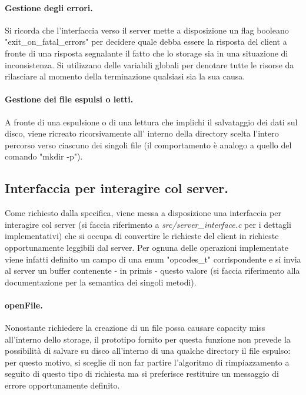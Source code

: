 \documentclass[11pt, italian, openany]{book}
\begin{document}
\begin{sloppypar}
\paragraph*{Gestione degli errori.}
Si ricorda che l'interfaccia verso il server mette a disposizione un flag booleano "exit\_on\_fatal\_errors" per decidere quale
debba essere la risposta del client a fronte di una risposta segnalante il fatto che lo storage sia in una situazione di
inconsistenza. Si utilizzano delle variabili globali per denotare tutte le risorse da rilasciare al momento della terminazione
qualsiasi sia la sua causa.

\paragraph*{Gestione dei file espulsi o letti.}
A fronte di una espulsione o di una lettura che implichi il salvataggio dei dati sul disco, viene ricreato ricorsivamente all'
interno della directory scelta l'intero percorso verso ciascuno dei singoli file (il comportamento \`e analogo a quello del comando
"mkdir -p").

\subsection{Interfaccia per interagire col server.}
Come richiesto dalla specifica, viene messa a disposizione una interfaccia per interagire col server (si faccia riferimento a 
\textit{src/server\_interface.c} per i dettagli implementativi) che si occupa di convertire le richieste del client in
richieste opportunamente leggibili dal server. Per ognuna delle operazioni implementate viene infatti definito un campo di una enum
"opcodes\_t" corrispondente e si invia al server un buffer contenente - in primis - questo valore (si faccia riferimento alla
documentazione per la semantica dei singoli metodi).

\paragraph*{openFile.}
Nonostante richiedere la creazione di un file possa causare capacity miss all'interno dello storage, il prototipo fornito
per questa funzione non prevede la possibilit\`a di salvare su disco all'interno di una qualche directory il file espulso:
per questo motivo, si sceglie di non far partire l'algoritmo di rimpiazzamento a seguito di questo tipo di richiesta ma si
preferisce restituire un messaggio di errore opportunamente definito.


\end{sloppypar}
\end{document}
